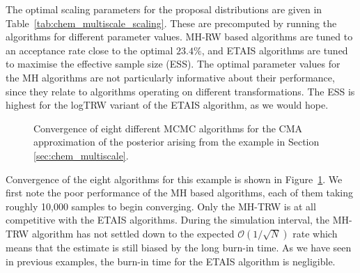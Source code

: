 \documentclass[final]{siamltex}
\begin{document}
The optimal scaling parameters for the proposal distributions are
given in Table~\ref{tab:chem_multiscale_scaling}. These are
precomputed by running the algorithms for different parameter
values. MH-RW based algorithms are tuned to an acceptance rate close
to the optimal $23.4\%$, and ETAIS algorithms are tuned to maximise the
effective sample size (ESS). The optimal parameter values for the MH
algorithms are not particularly informative about their performance,
since they relate to algorithms operating on different
transformations. The ESS is highest for the logTRW variant
of the ETAIS algorithm, as we would hope.

\begin{figure}[!htb]
\centering
{}
\caption{Convergence of eight different MCMC algorithms for the CMA
  approximation of the  posterior arising from the example in Section \ref{sec:chem_multiscale}.}
\label{fig:chem_multiscale_L2}
\end{figure}

Convergence of the eight algorithms for this example is shown in Figure~\ref{fig:chem_multiscale_L2}. We first note the poor performance of the MH based algorithms, each of them taking roughly 10,000 samples to begin converging. Only the MH-TRW is at all competitive with the ETAIS algorithms. During the simulation interval, the MH-TRW algorithm has not settled down to the expected $\mathcal{O}(1/\sqrt{N})$ rate which means that the estimate is still biased by the long burn-in time. As we have seen in previous examples, the burn-in time for the ETAIS algorithm is negligible.
\end{document}
